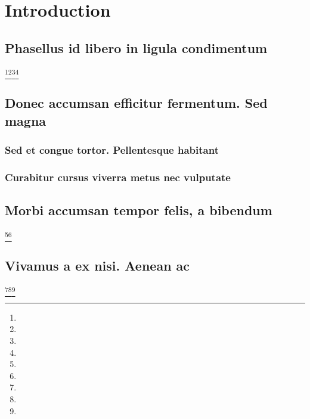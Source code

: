 \documentclass[%
  english,%
]{doctorate}
\begin{document}
\tableofcontents

\listoffigures

\listoftables

\printglossary[type=\acronymtype]

\printglossary[type=symlist]

\listoftodos

\mainmatter


\chapter{Introduction}

\section{Phasellus id libero in ligula condimentum}

\lipsum[1-8]\footnote{\lipsum[1]}\footnote{\lipsum[1]}\footnote{\lipsum[1]}\footnote{\lipsum[1]}

\section{Donec accumsan efficitur fermentum. Sed magna}

\lipsum[1-8]

\subsection{Sed et congue tortor. Pellentesque habitant}

\lipsum[1-8]

\subsection{Curabitur cursus viverra metus nec vulputate}

\lipsum[1-8]

\section{Morbi accumsan tempor felis, a bibendum}

\lipsum[1-8]\footnote{\lipsum[1]}\footnote{\lipsum[1]}

\section{Vivamus a ex nisi. Aenean ac}

\lipsum[1-8]\footnote{\lipsum[1]}\footnote{\lipsum[1]}\footnote{\lipsum[1]}
\end{document}
